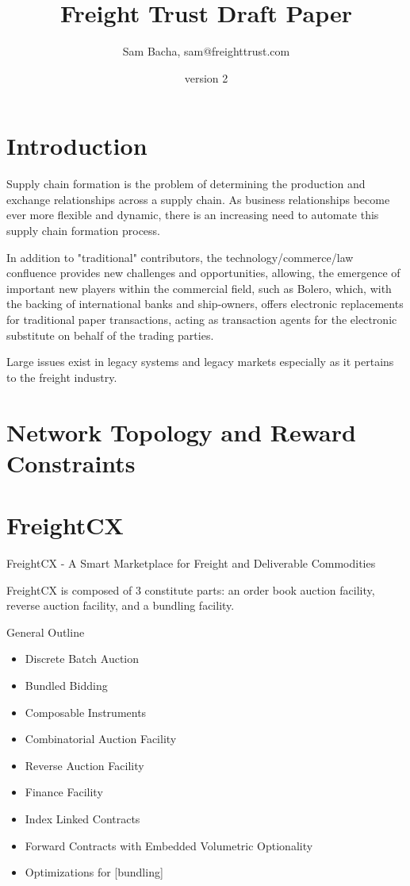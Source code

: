 \documentclass{article}
\title{Freight Trust Draft Paper}
\author{Sam Bacha, sam@freighttrust.com}
\date{version 2}
\begin{document}
\maketitle

\section{Introduction}

Supply chain formation is the problem of determining the production and exchange
relationships across a supply chain. As business
relationships become ever more flexible and dynamic, there is an increasing need to
automate this supply chain formation process.


In addition to "traditional" contributors, the technology/commerce/law confluence provides new challenges and opportunities, allowing, the emergence of important new players within the commercial field, such as Bolero, which, with the backing of international banks and ship-owners, offers electronic replacements for traditional paper transactions, acting as transaction agents for the electronic substitute on behalf of the trading parties. 

Large issues exist in legacy systems and legacy markets especially as it pertains to the freight industry. 

\section{Network Topology and Reward Constraints}



\section{FreightCX}


FreightCX - A Smart Marketplace for Freight and Deliverable Commodities 

FreightCX is composed of 3 constitute parts: an order book auction facility, reverse auction facility, and a bundling facility.

General Outline

\begin{itemize}
\item Discrete Batch Auction
\item Bundled Bidding
\item Composable Instruments
\item Combinatorial Auction Facility
\item Reverse Auction Facility
\item Finance Facility
\item Index Linked Contracts
\item Forward Contracts with Embedded Volumetric Optionality
\item Optimizations for [bundling]
\end{itemize}
    
\end{document}
